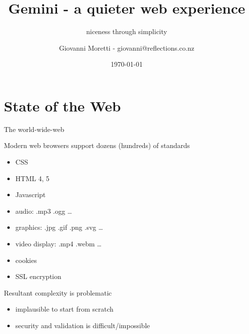 \documentclass[presentation, 11pt,  aspectratio=169]{beamer}
\author{Giovanni Moretti - giovanni@reflections.co.nz}
\date{\today}
\title{Gemini - a quieter web experience}
\subtitle{niceness through simplicity}
\begin{document}
\maketitle

\section*{State of the Web}
\label{sec:orgda71557}
\begin{frame}[label={sec:org555cada}]{The world-wide-web}
\begin{block}{Modern web browsers support dozens (hundreds) of standards}
\begin{itemize}
\item CSS\\
\item HTML 4, 5\\
\item Javascript\\
\item audio: .mp3 .ogg \ldots{}\\
\item graphics: .jpg .gif .png .svg \ldots{}\\
\item video display: .mp4 .webm \ldots{}\\
\item cookies\\
\item SSL encryption\\
\end{itemize}
\pause
\end{block}

\begin{block}{Resultant complexity is problematic}
\begin{itemize}
\item implausible to start from scratch\\
\item security and validation is difficult/impossible\\
\end{itemize}
\end{block}
\end{frame}
\end{document}
